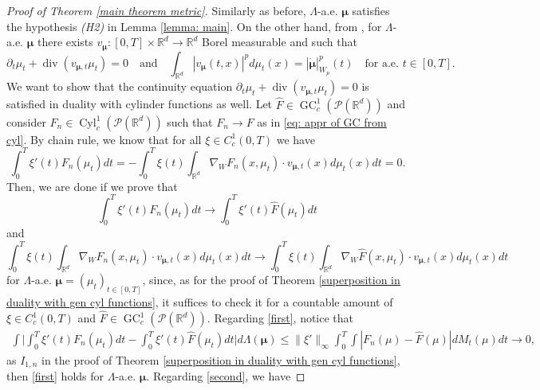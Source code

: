 \documentclass[10pt,leqno]{amsart}
\numberwithin{equation}{section}
\newcommand{\R}{\mathbb{R}}
\newcommand{\PP}{\mathcal{P}}
\begin{document}
\begin{proof}[Proof of Theorem \ref{main theorem metric}]
    Similarly as before, $\Lambda$-a.e. $\boldsymbol{\mu}$ satisfies the hypothesis \textit{(H2)} in Lemma \ref{lemma: main}. On the other hand, from \cite[Theorem 8.3.1]{ambrosio2005gradient}, for $\Lambda$-a.e. $\boldsymbol{\mu}$ there exists $v_{\boldsymbol{\mu}} : [0,T]\times \R^d \to \R^d$ Borel measurable and such that 
    \begin{equation}\label{eq: vf and velocity}
    \partial_t\mu_t + \operatorname{div}(v_{\boldsymbol{\mu},t}\mu_t) = 0 \quad \text{and} \quad \int_{\R^d} |v_{\boldsymbol{\mu}}(t,x)|^pd\mu_t(x) = |\dot{\boldsymbol{\mu}}|_{W_p}^p(t) \quad \text{for a.e. }t\in[0,T].
    \end{equation}
    We want to show that the continuity equation $\partial_t\mu_t + \operatorname{div}(v_{\boldsymbol{\mu},t}\mu_t) = 0$ is satisfied in duality with cylinder functions as well. Let $\hat{F}\in \operatorname{GC}_c^1(\PP(\R^d))$ and consider $F_n\in \operatorname{Cyl}_c^1(\PP(\R^d))$ such that $F_n \to F$ as in \eqref{eq: appr of GC from cyl}. By chain rule, we know that for all $\xi\in C_c^1(0,T)$ we have 
    \[\int_0^T \xi'(t) F_n(\mu_t) dt = - \int_0^T \xi(t) \int_{\R^d} \nabla_WF_n(x,\mu_t)\cdot v_{\boldsymbol{\mu},t}(x) d\mu_t(x) dt = 0.\]
    Then, we are done if we prove that 
    \begin{equation}\label{first}
        \int_0^T \xi'(t) F_n(\mu_t) dt \to \int_0^T \xi'(t) \hat{F}(\mu_t) dt
    \end{equation}
    and
    \begin{equation}\label{second}
    \int_0^T \xi(t) \int_{\R^d} \nabla_WF_n(x,\mu_t)\cdot v_{\boldsymbol{\mu},t}(x) d\mu_t(x) dt \to \int_0^T \xi(t) \int_{\R^d} \nabla_W\hat{F}(x,\mu_t)\cdot v_{\boldsymbol{\mu},t}(x) d\mu_t(x) dt
    \end{equation}
    for $\Lambda$-a.e. $\boldsymbol{\mu} = (\mu_t)_{t\in[0,T]}$, since, as for the proof of Theorem \ref{superposition in duality with gen cyl functions}, it suffices to check it for a countable amount of $\xi \in C_c^1(0,T)$ and $\hat{F}\in \operatorname{GC}_c^1(\PP(\R^d))$. Regarding \eqref{first}, notice that 
    \begin{align*}
        \int \bigg|\int_0^T \xi'(t) F_n(\mu_t) dt - \int_0^T \xi'(t) \hat{F}(\mu_t) dt \bigg| d\Lambda(\boldsymbol{\mu}) \leq \|\xi'\|_\infty \int_0^T \int |F_n(\mu) - \hat{F}(\mu)| dM_t(\mu) dt \to 0,
    \end{align*}
    as $I_{1,n}$ in the proof of Theorem \eqref{superposition in duality with gen cyl functions}, then \eqref{first} holds for $\Lambda$-a.e. $\boldsymbol{\mu}$. Regarding \eqref{second}, we have 

\end{proof}
\end{document}

